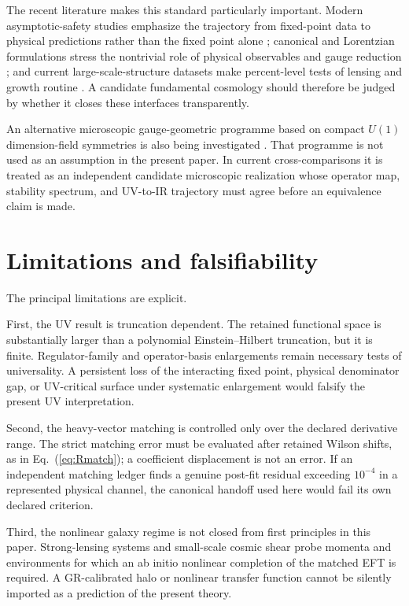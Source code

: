 \documentclass[12pt]{iopart}
\begin{document}
The recent literature makes this standard particularly important.  Modern asymptotic-safety studies emphasize the trajectory from fixed-point data to physical predictions rather than the fixed point alone \cite{SaueressigSilva2024}; canonical and Lorentzian formulations stress the nontrivial role of physical observables and gauge reduction \cite{DAngelo2024,Thiemann2024}; and current large-scale-structure datasets make percent-level tests of lensing and growth routine \cite{DESI2024BAO,DESI2025DR2BAO,MadhavacherilACT2023,DalalHSC2023}.  A candidate fundamental cosmology should therefore be judged by whether it closes these interfaces transparently.

An alternative microscopic gauge-geometric programme based on compact $U(1)$ dimension-field symmetries is also being investigated \cite{PartanenTulkki2025}.  That programme is not used as an assumption in the present paper.  In current cross-comparisons it is treated as an independent candidate microscopic realization whose operator map, stability spectrum, and UV-to-IR trajectory must agree before an equivalence claim is made.

\section{Limitations and falsifiability}
\label{sec:limits}

The principal limitations are explicit.

First, the UV result is truncation dependent.  The retained functional space is substantially larger than a polynomial Einstein--Hilbert truncation, but it is finite.  Regulator-family and operator-basis enlargements remain necessary tests of universality.  A persistent loss of the interacting fixed point, physical denominator gap, or UV-critical surface under systematic enlargement would falsify the present UV interpretation.

Second, the heavy-vector matching is controlled only over the declared derivative range.  The strict matching error must be evaluated after retained Wilson shifts, as in Eq.~(\ref{eq:Rmatch}); a coefficient displacement is not an error.  If an independent matching ledger finds a genuine post-fit residual exceeding $10^{-4}$ in a represented physical channel, the canonical handoff used here would fail its own declared criterion.

Third, the nonlinear galaxy regime is not closed from first principles in this paper.  Strong-lensing systems and small-scale cosmic shear probe momenta and environments for which an ab initio nonlinear completion of the matched EFT is required.  A GR-calibrated halo or nonlinear transfer function cannot be silently imported as a prediction of the present theory.
\end{document}
